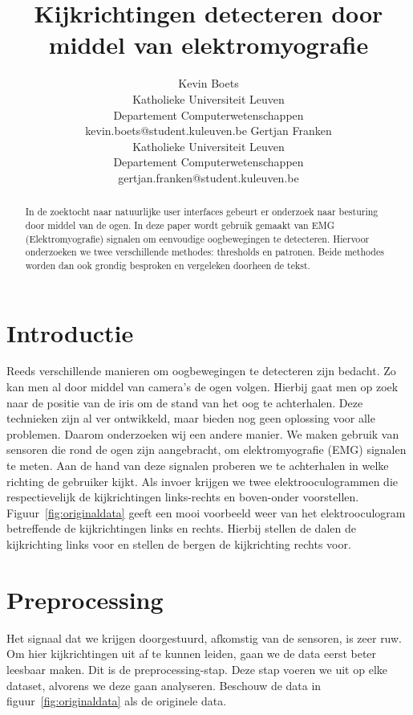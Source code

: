 \documentclass{article}
\title{Kijkrichtingen detecteren door middel van elektromyografie}
\author{Kevin Boets \\ Katholieke Universiteit Leuven\\ Departement Computerwetenschappen \\ kevin.boets@student.kuleuven.be
\And
Gertjan Franken \\ Katholieke Universiteit Leuven\\ Departement Computerwetenschappen \\ gertjan.franken@student.kuleuven.be}
\begin{document}
\maketitle

\begin{abstract}
In de zoektocht naar natuurlijke user interfaces gebeurt er onderzoek naar besturing door middel van de ogen. In deze paper wordt gebruik gemaakt van EMG (Elektromyografie) signalen om eenvoudige oogbewegingen te detecteren. Hiervoor onderzoeken we twee verschillende methodes: thresholds en patronen. Beide methodes worden dan ook grondig besproken en vergeleken doorheen de tekst.
\end{abstract}

\section{Introductie}

Reeds verschillende manieren om oogbewegingen te detecteren zijn bedacht. Zo kan men al door middel van camera's de ogen volgen. Hierbij gaat men op zoek naar de positie van de iris om de stand van het oog te achterhalen. Deze technieken zijn al ver ontwikkeld, maar bieden nog geen oplossing voor alle problemen. Daarom onderzoeken wij een andere manier. We maken gebruik van sensoren die rond de ogen zijn aangebracht, om elektromyografie (EMG) signalen te meten. Aan de hand van deze signalen proberen we te achterhalen in welke richting de gebruiker kijkt. Als invoer krijgen we twee elektrooculogrammen die respectievelijk de kijkrichtingen links-rechts en boven-onder voorstellen. Figuur~\ref{fig:originaldata} geeft een mooi voorbeeld weer van het elektrooculogram betreffende de kijkrichtingen links en rechts. Hierbij stellen de dalen de kijkrichting links voor en stellen de bergen de kijkrichting rechts voor.

\section{Preprocessing}

Het signaal dat we krijgen doorgestuurd, afkomstig van de sensoren, is zeer ruw. Om hier kijkrichtingen uit af te kunnen leiden, gaan we de data eerst beter leesbaar maken. Dit is de preprocessing-stap. Deze stap voeren we uit op elke dataset,  alvorens we deze gaan analyseren. Beschouw de data in figuur~\ref{fig:originaldata} als de originele data.
\end{document}
